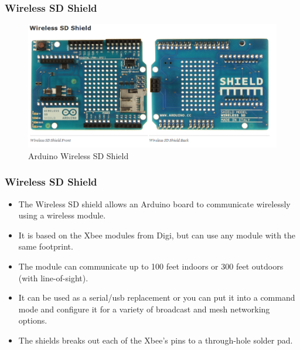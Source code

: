 \documentclass{beamer}
\begin{document}
\frame
{
	\frametitle{Wireless SD Shield}
	\begin{figure}[h!]
  		\centering
    	\includegraphics[width=\textwidth]{../Images/Arduino_WS.png}
		\caption{Arduino Wireless SD Shield}
	\end{figure}
}

\frame
{
	\frametitle{Wireless SD Shield}
	\begin{itemize}
	\item The Wireless SD shield allows an Arduino board to communicate wirelessly using a wireless module.
 	\item It is based on the Xbee modules from Digi, but can use any module with the same footprint.
 	\item The module can communicate up to 100 feet indoors or 300 feet outdoors (with line-of-sight).
 	\item It can be used as a serial/usb replacement or you can put it into a command mode and configure it for a variety of broadcast and mesh networking options. 
	\item The shields breaks out each of the Xbee's pins to a through-hole solder pad. 
	\end{itemize}
}
\end{document}
